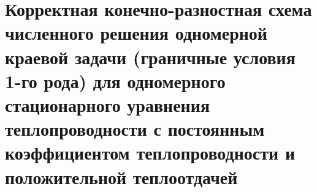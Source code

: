 \documentclass[__main__.tex]{subfiles}
\begin{document}
\section{Корректная конечно-разностная схема численного решения одномерной краевой задачи (граничные условия 1-го рода) для одномерного стационарного уравнения теплопроводности с постоянным коэффициентом теплопроводности и положительной теплоотдачей}
\end{document}
